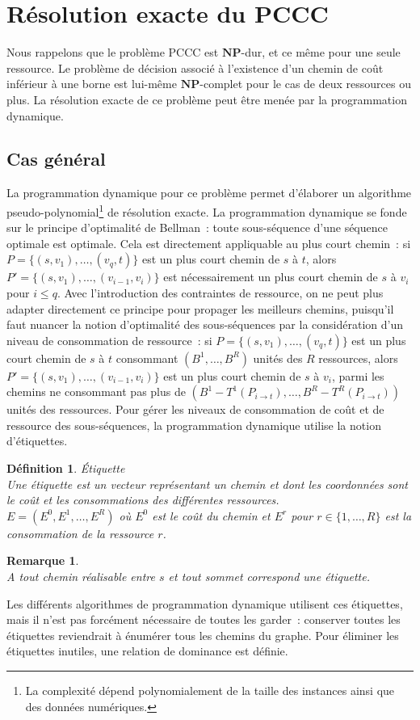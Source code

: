 \documentclass[10pt,francais]{llncs}
\newtheorem{rem}{Remarque}
\newtheorem{defs}{D\'efinition}
\begin{document}
\section{R\'esolution exacte du PCCC}\label{sec-resol} Nous rappelons que le probl\`eme PCCC est $\mathbf{NP}$-dur, et ce m\^eme pour une seule ressource. Le probl\`eme de d\'ecision associ\'e \`a l'existence d'un chemin de co\^ut inf\'erieur \`a une borne est lui-m\^eme $\mathbf{NP}$-complet pour le cas de deux ressources ou plus. La r\'esolution exacte de ce probl\`eme peut \^etre men\'ee par la programmation dynamique.

\subsection{Cas g\'en\'eral}\label{sub-resol-progdyn}
La programmation dynamique pour ce probl\`eme permet d'\'elaborer un algorithme pseudo-polynomial\footnote{La complexit\'e d\'epend polynomialement de la taille des instances ainsi que des donn\'ees num\'eriques.} de r\'esolution exacte. La programmation dynamique se fonde sur le principe d'optimalit\'e de Bellman~: toute sous-s\'equence d'une s\'equence optimale est optimale. Cela est directement appliquable au plus court chemin~: si $P=\{(s,v_1),\ldots,(v_q,t)\}$ est un plus court chemin de $s$ \`a $t$, alors $P'=\{(s,v_1),\ldots,(v_{i-1},v_i)\}$ est n\'ecessairement un plus court chemin de $s$ \`a $v_i$ pour $i \leq q$.  Avec l'introduction des contraintes de ressource, on ne peut plus adapter directement ce principe pour propager les meilleurs chemins, puisqu'il faut nuancer la notion d'optimalit\'e des sous-s\'equences par la consid\'eration d'un niveau de consommation de ressource~: si $P=\{(s,v_1),\ldots,(v_q,t)\}$ est un plus court chemin de $s$ \`a $t$ consommant $(B^1,\ldots,B^R)$ unit\'es des $R$ ressources, alors  $P'=\{(s,v_1),\ldots,(v_{i-1},v_i)\}$ est un plus court chemin de $s$ \`a $v_i$, parmi les chemins ne consommant pas plus de $(B^1-T^1(P_{i\rightarrow t}),\ldots,B^R-T^R(P_{i\rightarrow t}))$ unit\'es des ressources. Pour g\'erer les niveaux de consommation de co\^ut et de ressource des sous-s\'equences, la programmation dynamique utilise la notion d'\'etiquettes.
\begin{defs}
\'Etiquette\\
Une \'etiquette est un vecteur repr\'esentant un chemin et dont les coordonn\'ees sont le co\^ut et les consommations des diff\'erentes ressources.\\
$E = (E^0, E^1, \ldots ,E^R)$ o\`u $E^0$ est le co\^ut du chemin et $E^r$ pour $r\in \{1,\ldots ,R\}$ est la consommation de la ressource $r$. 
\end{defs}
\begin{rem}
~\\
A tout chemin r\'ealisable entre $s$ et tout sommet correspond une \'etiquette.
\end{rem}
Les diff\'erents algorithmes de programmation dynamique utilisent ces \'etiquettes, mais il n'est pas forc\'ement n\'ecessaire de toutes les garder~: conserver toutes les \'etiquettes reviendrait \`a \'enum\'erer tous les chemins du graphe. Pour \'eliminer les \'etiquettes inutiles, une relation de dominance est d\'efinie.
\end{document}
